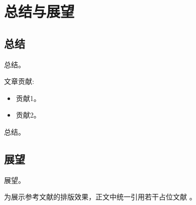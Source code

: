\chapter{总结与展望}

\section{总结}

总结。

文章贡献:

\begin{itemize}
    \item 贡献1。

    \item 贡献2。

\end{itemize}

总结。
  
\section{展望}

展望。

为展示参考文献的排版效果，正文中统一引用若干占位文献
\cite{Shannon1948,LeCun2015,He2016,Vaswani2017,Devlin2019,Brown2020,Goodfellow2014,Krizhevsky2012,Szegedy2015,Simonyan2015,Howard2019,Geiger2013,Cordts2016,Knuth1986,Lamport1994,Mittelbach2004,Liu2023,Chen2022,Li2021,Sun2022}。




